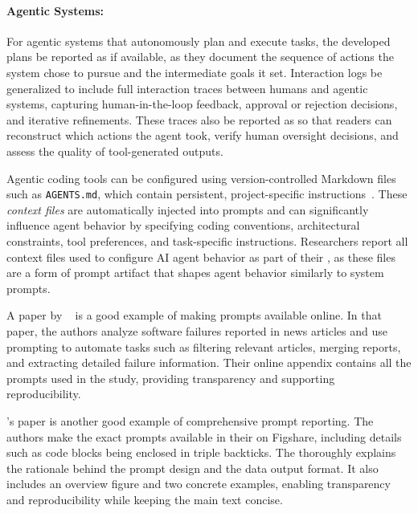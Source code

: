 \paragraph{Agentic Systems:}
For agentic systems that autonomously plan and execute tasks, the developed plans \should be reported as \supplementarymaterial if available, as they document the sequence of actions the system chose to pursue and the intermediate goals it set.
Interaction logs \should be generalized to include full interaction traces between humans and agentic systems, capturing human-in-the-loop feedback, approval or rejection decisions, and iterative refinements.
These traces \should also be reported as \supplementarymaterial so that readers can reconstruct which actions the agent took, verify human oversight decisions, and assess the quality of tool-generated outputs.

Agentic coding tools can be configured using version-controlled Markdown files such as \texttt{AGENTS.md}, which contain persistent, project-specific instructions~\cite{mohsenimofidi2026context}.
These \emph{context files} are automatically injected into prompts and can significantly influence agent behavior by specifying coding conventions, architectural constraints, tool preferences, and task-specific instructions.
Researchers \should report all context files used to configure AI agent behavior as part of their \supplementarymaterial, as these files are a form of prompt artifact that shapes agent behavior similarly to system prompts.


A paper by \citeauthor{anandayuvaraj2024fail}~\cite{anandayuvaraj2024fail} is a good example of making prompts available online.
In that paper, the authors analyze software failures reported in news articles and use prompting to automate tasks such as filtering relevant articles, merging reports, and extracting detailed failure information.
Their online appendix contains all the prompts used in the study, providing transparency and supporting reproducibility.

\citeauthor{Liang2024}'s paper is another good example of comprehensive prompt reporting.
The authors make the exact prompts available in their \supplementarymaterial on Figshare, including details such as code blocks being enclosed in triple backticks.
The \paper thoroughly explains the rationale behind the prompt design and the data output format.
It also includes an overview figure and two concrete examples, enabling transparency and reproducibility while keeping the main text concise.

